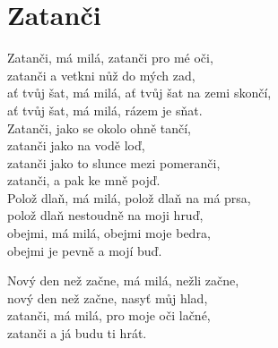 \section{Zatanči}
\onehalfspacing

Zatanči, má milá, zatanči pro mé oči,\\
zatanči a vetkni nůž do mých zad,\\
ať tvůj šat, má milá, ať tvůj šat na zemi skončí,\\
ať tvůj šat, má milá, rázem je sňat.\\

{}Zatanči, jako se okolo ohně tančí,\\
zatanči jako na vodě loď,\\
zatanči jako to slunce mezi pomeranči,\\
zatanči, a pak ke mně pojď.\\

Polož dlaň, má milá, polož dlaň na má prsa,\\
polož dlaň nestoudně na moji hruď,\\
obejmi, má milá, obejmi moje bedra,\\
obejmi je pevně a mojí buď.\\


\sloka
Nový den než začne, má milá, nežli začne,\\
nový den než začne, nasyť můj hlad,\\
zatanči, má milá, pro moje oči lačné,\\
zatanči a já budu ti hrát.\\





